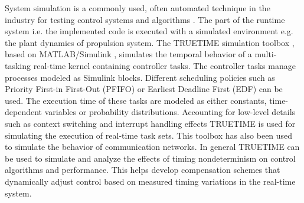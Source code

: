 System simulation is a commonly used, often automated technique in the industry
for testing control systems and algorithms \cite{henriksson2003truetime,
kim1994simulation}. The part of the runtime system i.e. the implemented code is
executed with a simulated environment e.g. the plant dynamics of propulsion
system. The TRUETIME simulation toolbox \cite{henriksson2002truetime}, based on
MATLAB/Simulink \cite{simulink1993mathworks}, simulates the temporal behavior of
a multi-tasking real-time kernel containing controller tasks. The controller
tasks manage processes modeled as Simulink blocks. Different scheduling policies
such as Priority First-in First-Out (PFIFO) or Earliest Deadline First (EDF) can
be used. The execution time of these tasks are modeled as either constants,
time-dependent variables or probability distributions. Accounting for low-level
details such as context switching and interrupt handling effects TRUETIME is
used for simulating the execution of real-time task sets. This toolbox has also
been used to simulate the behavior of communication networks. In general
TRUETIME can be used to simulate and analyze the effects of timing
nondeterminism on control algorithms and performance. This helps develop
compensation schemes that dynamically adjust control based on measured timing
variations in the real-time system.

